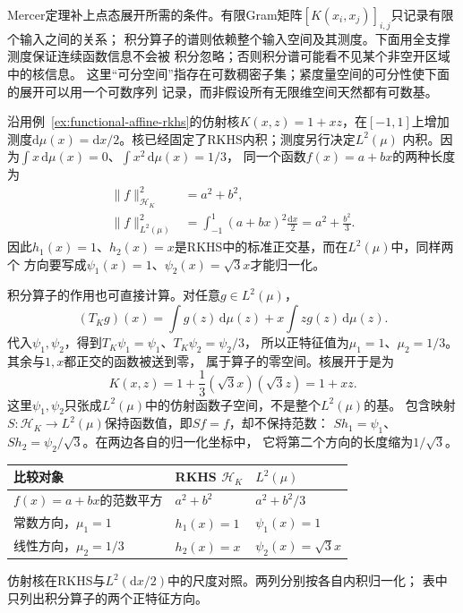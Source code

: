 Mercer定理补上点态展开所需的条件。有限Gram矩阵$[K(x_i,x_j)]_{i,j}$只记录有限个输入之间的关系；
积分算子的谱则依赖整个输入空间及其测度。下面用全支撑测度保证连续函数信息不会被
积分忽略；否则积分谱可能看不见某个非空开区域中的核信息。
这里“可分空间”指存在可数稠密子集；紧度量空间的可分性使下面的展开可以用一个可数序列
记录，而非假设所有无限维空间天然都有可数基。

\begin{example}[同一个核在两种内积下的坐标]
\label{ex:functional-affine-mercer-coordinates}
沿用例~\ref{ex:functional-affine-rkhs}的仿射核$K(x,z)=1+xz$，在$[-1,1]$上增加
测度$\mathrm d\mu(x)=\mathrm dx/2$。核已经固定了RKHS内积；测度另行决定$L^2(\mu)$
内积。因为$\int x\,\mathrm d\mu(x)=0$、$\int x^2\,\mathrm d\mu(x)=1/3$，
同一个函数$f(x)=a+bx$的两种长度为
\begin{equation}
 \begin{aligned}
  \lVert f\rVert_{\mathcal H_K}^2&=a^2+b^2,\\
  \lVert f\rVert_{L^2(\mu)}^2
  &=\int_{-1}^1(a+bx)^2\frac{\mathrm dx}{2}
    =a^2+\frac{b^2}{3}.
 \end{aligned}
 \label{eq:functional-affine-two-norms}
\end{equation}
因此$h_1(x)=1$、$h_2(x)=x$是RKHS中的标准正交基，而在$L^2(\mu)$中，同样两个
方向要写成$\psi_1(x)=1$、$\psi_2(x)=\sqrt3x$才能归一化。

积分算子的作用也可直接计算。对任意$g\in L^2(\mu)$，
\[
 (T_Kg)(x)=\int g(z)\,\mathrm d\mu(z)
             +x\int zg(z)\,\mathrm d\mu(z).
\]
代入$\psi_1,\psi_2$，得到$T_K\psi_1=\psi_1$、$T_K\psi_2=\psi_2/3$，
所以正特征值为$\mu_1=1$、$\mu_2=1/3$。其余与$1,x$都正交的函数被送到零，
属于算子的零空间。核展开于是为
\[
 K(x,z)=1+\frac13(\sqrt3x)(\sqrt3z)=1+xz.
\]
这里$\psi_1,\psi_2$只张成$L^2(\mu)$中的仿射函数子空间，不是整个$L^2(\mu)$的基。
包含映射$S:\mathcal H_K\to L^2(\mu)$保持函数值，即$Sf=f$，却不保持范数：
$Sh_1=\psi_1$、$Sh_2=\psi_2/\sqrt3$。在两边各自的归一化坐标中，
它将第二个方向的长度缩为$1/\sqrt3$。
\end{example}

\begin{center}
\begin{minipage}{\linewidth}
 \centering\small
 \begin{tabularx}{\linewidth}{@{}lXX@{}}
 \toprule
 比较对象 & RKHS $\mathcal H_K$ & $L^2(\mu)$\\
 \midrule
 $f(x)=a+bx$的范数平方 & $a^2+b^2$ & $a^2+b^2/3$\\
 常数方向，$\mu_1=1$ & $h_1(x)=1$ & $\psi_1(x)=1$\\
 线性方向，$\mu_2=1/3$ & $h_2(x)=x$ & $\psi_2(x)=\sqrt3x$\\
 \bottomrule
 \end{tabularx}
   {仿射核在RKHS与$L^2(\mathrm dx/2)$中的尺度对照。两列分别按各自内积归一化；
   表中只列出积分算子的两个正特征方向。}
\end{minipage}
\end{center}



